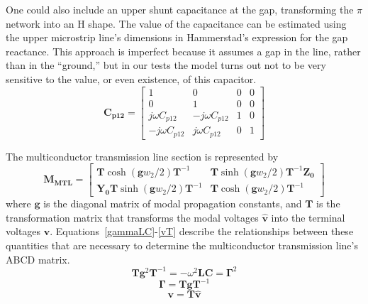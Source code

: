 \documentclass{allertonproc}
\begin{document}
One could also include an upper shunt capacitance at the gap, transforming the $\pi$ network into an H shape.  The value of the capacitance can be estimated using the upper microstrip line's dimensions in Hammerstad's expression for the gap reactance.  This approach is imperfect because it assumes a gap in the line, rather than in the ``ground,'' but in our tests the model turns out not to be very sensitive to the value, or even existence, of this capacitor.
\begin{equation}
\mathbf{C_{p12}} = \begin{bmatrix}1 & 0 & 0 & 0\\0 & 1 & 0 & 0\\ j\omega C_{p12} & -j\omega C_{p12} & 1 & 0\\ -j\omega C_{p12} & j\omega C_{p12} & 0 &1\end{bmatrix}
\end{equation}

The multiconductor transmission line section is represented by 
\begin{equation}\label{MTLsection}
\mathbf{M_{MTL}} = \begin{bmatrix}\mathbf{T}\cosh( \mathbf{g} w_2/2 )\mathbf{T}^{-1}   & \mathbf{T}\sinh( \mathbf{g} w_2/2 )\mathbf{T}^{-1}\mathbf{Z_0}\\ \mathbf{Y_0}\mathbf{T}\sinh( \mathbf{g} w_2/2 )\mathbf{T}^{-1} & \mathbf{T}\cosh( \mathbf{g} w_2/2 )\mathbf{T}^{-1} \end{bmatrix}
\end{equation}
where $\mathbf{g}$ is the diagonal matrix of modal propagation constants, and $\mathbf{T}$ is the transformation matrix that transforms the modal voltages $\hat{\mathbf{v}}$ into the terminal voltages $\mathbf{v}$.  \mbox{Equations \ref{gammaLC}-\ref{vT}} describe the relationships between these quantities that are necessary to determine the multiconductor transmission line's ABCD matrix.
\begin{equation}\label{gammaLC}
\mathbf{T}\mathbf{g}^2\mathbf{T}^{-1} = -\omega^2\mathbf{L}\mathbf{C} = \mathbf{\Gamma}^2
\end{equation}
\begin{equation}
\mathbf{\Gamma} = \mathbf{T}\mathbf{g}\mathbf{T}^{-1}
\end{equation}
\begin{equation}\label{vT}
\mathbf{v} = \mathbf{T}\hat{\mathbf{v}}
\end{equation}
\end{document}
